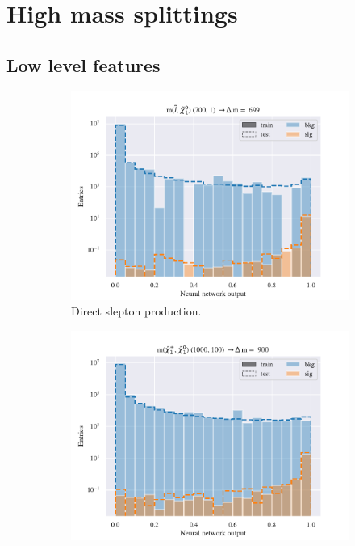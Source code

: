 \section{High mass splittings}

\subsection{Low level features}

\begin{figure}[H]
    \centering
    \begin{subfigure}[t!]{0.49\textwidth}
        \includegraphics[width = \textwidth]{Figures/SlepSlep/ML/NN/Low_level/High/scaled_train_test_396033.pdf}
        \caption{Direct slepton production.}
        \label{fig:}
    \end{subfigure}
    \begin{subfigure}[t!]{0.49\textwidth}
        \includegraphics[width = \textwidth]{Figures/SlepSnu/NN/Low_level/High/scaled_train_test_397169.pdf}

\end{subfigure}
\end{figure}
